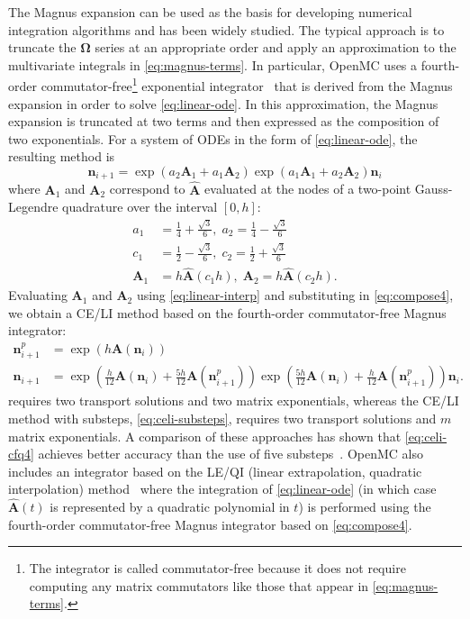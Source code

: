 \documentclass[3p,authoryear]{elsarticle}
\newcommand{\vect}[1]{\mathbf{#1}} %
\begin{document}
The Magnus expansion can be used as the basis for developing numerical
integration algorithms and has been widely studied. The typical approach is to
truncate the $\vect{\Omega}$ series at an appropriate order and apply an
approximation to the multivariate integrals in \cref{eq:magnus-terms}. In
particular, OpenMC uses a fourth-order commutator-free\footnote{The integrator
is called commutator-free because it does not require computing any matrix
commutators like those that appear in \cref{eq:magnus-terms}.} exponential
integrator~\citep{blanes2006anm} that is derived from the Magnus expansion in
order to solve \cref{eq:linear-ode}. In this approximation, the Magnus expansion
is truncated at two terms and then expressed as the composition of two
exponentials. For a system of ODEs in the form of \cref{eq:linear-ode}, the
resulting method is
\begin{equation}
  \label{eq:compose4}
  \vect{n}_{i+1} = \exp (a_2 \vect{A}_1 + a_1 \vect{A}_2)
  \exp (a_1 \vect{A}_1 + a_2 \vect{A}_2) \vect{n}_i
\end{equation}
where $\vect{A}_1$ and $\vect{A}_2$ correspond to $\hat{\vect{A}}$ evaluated at
the nodes of a two-point Gauss-Legendre quadrature over the interval $[0,h]$:
\begin{equation}
  \begin{split}
    a_1 &= \frac{1}{4} + \frac{\sqrt{3}}{6}, \; a_2 = \frac{1}{4} - \frac{\sqrt{3}}{6} \\
    c_1 &= \frac{1}{2} - \frac{\sqrt{3}}{6}, \; c_2 = \frac{1}{2} + \frac{\sqrt{3}}{6} \\
    \vect{A}_1 &= h\hat{\vect{A}}\left ( c_1 h\right ), \; \vect{A}_2 = h\hat{\vect{A}}\left ( c_2 h\right ).
  \end{split}
\end{equation}
Evaluating $\vect{A}_1$ and $\vect{A}_2$ using \cref{eq:linear-interp} and
substituting in \cref{eq:compose4}, we obtain a CE/LI method based on the
fourth-order commutator-free Magnus integrator:
\begin{equation}
  \label{eq:celi-cfq4}
  \begin{split}
  \vect{n}_{i+1}^p &= \exp \left ( h \vect{A}(\vect{n}_i ) \right ) \\
  \vect{n}_{i+1} &= \exp \left( \frac{h}{12} \vect{A}(\vect{n}_i) +
    \frac{5h}{12} \vect{A}(\vect{n}_{i+1}^p) \right)
  \exp \left( \frac{5h}{12} \vect{A}(\vect{n}_i) +
  \frac{h}{12} \vect{A}(\vect{n}_{i+1}^p) \right) \vect{n}_i.
  \end{split}
\end{equation}
 requires two transport solutions and two matrix
exponentials, whereas the CE/LI method with substeps, \cref{eq:celi-substeps},
requires two transport solutions and $m$ matrix exponentials. A comparison of
these approaches has shown that \cref{eq:celi-cfq4} achieves better accuracy
than the use of five substeps~\citep{josey2017phd}. OpenMC also includes an
integrator based on the LE/QI (linear extrapolation, quadratic interpolation)
method~\citep{isotalo2011ane2} where the integration of \cref{eq:linear-ode} (in
which case $\hat{\vect{A}}(t)$ is represented by a quadratic polynomial in $t$)
is performed using the fourth-order commutator-free Magnus integrator based on
\cref{eq:compose4}.
\end{document}
